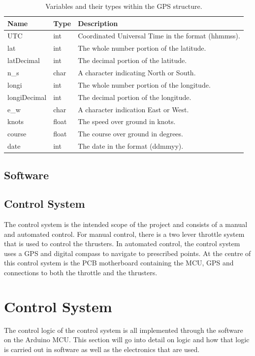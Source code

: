 		\begin{table}[!hb]
			\begin{center}
				\caption{Variables and their types within the GPS structure.}
				\label{tab:3:GPSstruct}
				\begin{tabular}{|l|l|l|}
					\hline
					\textbf{Name} & \textbf{Type} & \textbf{Description} \\
					\hline
					UTC & int & Coordinated Universal Time in the format (hhmmss). \\
					\hline
					lat & int & The whole number portion of the latitude. \\
					\hline
					latDecimal & int & The decimal portion of the latitude. \\
					\hline
					n\_s & char & A character indicating North or South. \\
					\hline
					longi & int & The whole number portion of the longitude. \\
					\hline 
					longiDecimal & int & The decimal portion of the longitude. \\
					\hline 
					e\_w & char & A character indication East or West. \\
					\hline
					knots & float & The speed over ground in knots. \\
					\hline
					course & float & The course over ground in degrees. \\
					\hline
					date & int & The date in the format (ddmmyy). \\
					\hline
				\end{tabular}
			\end{center}
		\end{table}
	\subsection{Software}


\subsection{Control System}
The control system is the intended scope of the project and consists of a manual and automated control. For manual control, there is a two lever throttle system that is used to control the thrusters. In automated control, the control system uses a GPS and digital compass to navigate to prescribed points. At the centre of this control system is the PCB motherboard containing the MCU, GPS and connections to both the throttle and the thrusters. 
\section{Control System}
The control logic of the control system is all implemented through the software on the Arduino MCU. This section will go into detail on logic and how that logic is carried out in software as well as the electronics that are used. 
